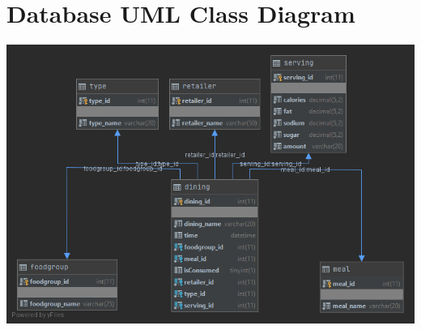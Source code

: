 \documentclass[table]{scrreprt}
\begin{document}
    \chapter{Database UML Class Diagram}
    
    \includegraphics[scale=0.6]{db-uml.png}
\end{document}
